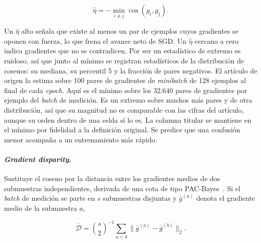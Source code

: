\begin{equation}
\hat{\eta} = -\min_{i \neq j} \cos(g_i, g_j).
\label{eq:confusion}
\end{equation}

Un $\hat{\eta}$ alto señala que existe al menos un par de ejemplos cuyos gradientes se oponen con fuerza, lo que frena el avance neto de SGD. Un $\hat{\eta}$ cercano a cero indica gradientes que no se contradicen. Por ser un estadístico de extremo es ruidoso, así que junto al mínimo se registran estadísticos de la distribución de cosenos: su mediana, su percentil 5 y la fracción de pares negativos. El artículo de origen la estima sobre 100 pares de gradientes de \emph{minibatch} de 128 ejemplos al final de cada \emph{epoch}. Aquí es el mínimo sobre los 32.640 pares de gradientes por ejemplo del \emph{batch} de medición. Es un extremo sobre muchos más pares y de otra distribución, así que su magnitud no es comparable con las cifras del artículo, aunque su orden dentro de una celda sí lo es. La columna titular se mantiene en el mínimo por fidelidad a la definición original. Se predice que una confusión menor acompaña a un entrenamiento más rápido.

\paragraph{\emph{Gradient disparity}.} Sustituye el coseno por la distancia entre los gradientes
medios de dos submuestras independientes, derivada de una cota de tipo PAC-Bayes~\cite{forouzesh2021disparity}. Si el \emph{batch} de medición se parte en $s$ submuestras disjuntas y $\bar{g}^{(a)}$ denota el gradiente medio de la submuestra $a$,

\begin{equation}
\overline{\mathcal{D}} = \binom{s}{2}^{-1} \sum_{a < b} \big\|\bar{g}^{(a)} - \bar{g}^{(b)}\big\|_2.
\label{eq:disparity}
\end{equation}

